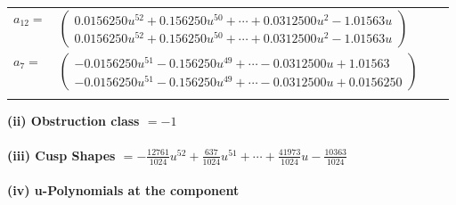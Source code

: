 \documentclass[1p]{elsarticle_modified}
\theoremstyle{definition}
\begin{document}
\begin{tabular}{m{7pt} m{180pt} m{7pt} m{180pt} }
\flushright $a_{12}=$&$\begin{pmatrix}0.0156250 u^{52}+0.156250 u^{50}+\cdots+0.0312500 u^{2}-1.01563 u\\0.0156250 u^{52}+0.156250 u^{50}+\cdots+0.0312500 u^{2}-1.01563 u\end{pmatrix}$ \\
\flushright $a_{7}=$&$\begin{pmatrix}-0.0156250 u^{51}-0.156250 u^{49}+\cdots-0.0312500 u+1.01563\\-0.0156250 u^{51}-0.156250 u^{49}+\cdots-0.0312500 u+0.0156250\end{pmatrix}$\\&\end{tabular}
\flushleft \textbf{(ii) Obstruction class $= -1$}\\~\\
\flushleft \textbf{(iii) Cusp Shapes $= -\frac{12761}{1024} u^{52}+\frac{637}{1024} u^{51}+\cdots+\frac{41973}{1024} u-\frac{10363}{1024}$}\\~\\
\newpage\renewcommand{\arraystretch}{1}
\flushleft \textbf{(iv) u-Polynomials at the component}\newline \\
\end{document}
